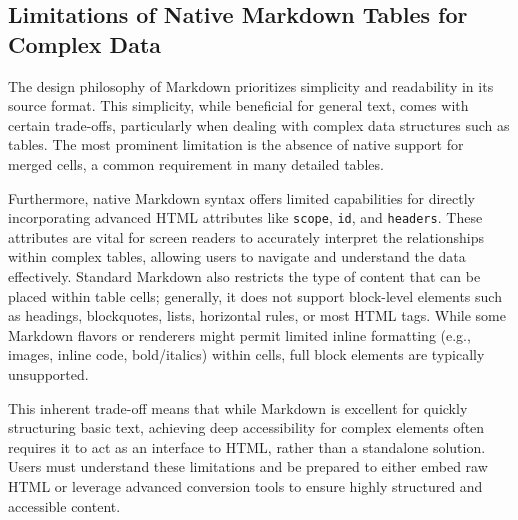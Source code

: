 \subsection{Limitations of Native Markdown Tables for Complex Data}
The design philosophy of Markdown prioritizes simplicity and readability in its source format. This simplicity, while beneficial for general text, comes with certain trade-offs, particularly when dealing with complex data structures such as tables. The most prominent limitation is the absence of native support for merged cells, a common requirement in many detailed tables.\cite{DocsToMarkdown}

Furthermore, native Markdown syntax offers limited capabilities for directly incorporating advanced HTML attributes like \texttt{scope}, \texttt{id}, and \texttt{headers}.\cite{MDNTableAccess} These attributes are vital for screen readers to accurately interpret the relationships within complex tables, allowing users to navigate and understand the data effectively.\cite{MDNTableAccess} Standard Markdown also restricts the type of content that can be placed within table cells; generally, it does not support block-level elements such as headings, blockquotes, lists, horizontal rules, or most HTML tags.\cite{MarkdownGuideExtended} While some Markdown flavors or renderers might permit limited inline formatting (e.g., images, inline code, bold/italics) within cells, full block elements are typically unsupported.\cite{DocsToMarkdown,MarkdownGuideExtended}

This inherent trade-off means that while Markdown is excellent for quickly structuring basic text, achieving deep accessibility for complex elements often requires it to act as an interface to HTML, rather than a standalone solution. Users must understand these limitations and be prepared to either embed raw HTML or leverage advanced conversion tools to ensure highly structured and accessible content.

